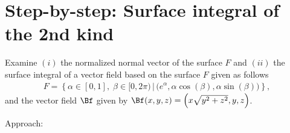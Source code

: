 \documentclass[12pt]{article}
\begin{document}
\clearpage
\section{Step-by-step: Surface integral of the 2nd kind}
\begin{exampleboxed}
	Examine 
	$(i)$
	the 
	normalized normal vector of the surface $F$
	and
	$(ii)$
	the
	surface integral of a vector field based on 
	the surface $F$
	given as follows
	\begin{align}
		F =
		\left\{
		\alpha\in[0,1],\; \beta \in \Big[ 0,2\pi \Big)
		\,\Bigg|\,
		\Big( e^\alpha, \alpha\cos(\beta), \alpha\sin(\beta) \Big)
		\right\},
	\end{align}
	and the vector field  $\Bf$ given by
	$\Bf(x,y,z) = \Big( x\sqrt{y^2+z^2}, y, z \Big)$.
\end{exampleboxed}
Approach:
\end{document}
